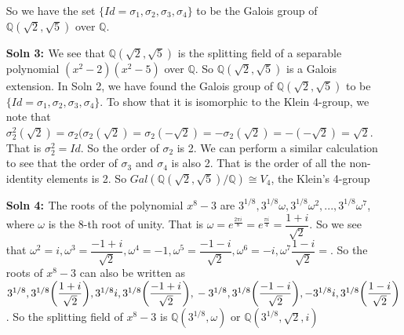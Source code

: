 \documentclass[12pt]{article}
\begin{document}
\begin{enumerate}
    So we have the set $\{Id=\sigma_1, \sigma_2,\sigma_3,\sigma_4\}$ to be the Galois group of $\mathbb{Q}(\sqrt2,\sqrt5)$ over $\mathbb{Q}$.
    \item[\bf{Soln 3: }]  We see that $\mathbb{Q}(\sqrt2,\sqrt5)$ is the splitting field of a separable polynomial $(x^2-2)(x^2-5)$ over $\mathbb{Q}$. So $\mathbb{Q}(\sqrt2,\sqrt5)$ is a Galois extension. In Soln 2, we have found the Galois group of $\mathbb{Q}(\sqrt2,\sqrt5)$ to be
    $\{Id=\sigma_1, \sigma_2,\sigma_3,\sigma_4\}$. To show that it is isomorphic to the Klein 4-group, we note that $\sigma_2^2(\sqrt2)=\sigma_2(\sigma_2(\sqrt2)=\sigma_2(-\sqrt2)=-\sigma_2(\sqrt2)=-(-\sqrt2)=\sqrt2$. That is $\sigma_2^2=Id$. So the order of $\sigma_2$ is 2. We can perform a similar calculation to see that the order of $\sigma_3$ and $\sigma_4$ is also 2. That is the order of all the non-identity elements is 2. So $Gal(\mathbb{Q}(\sqrt2,\sqrt5)/\mathbb{Q}) \cong V_4$, the Klein's 4-group

    \item[\bf{Soln 4: }]  The roots of the polynomial $x^8-3$ are $3^{1/8},3^{1/8}\omega,3^{1/8} \omega^2,...,3^{1/8}\omega^7$, where $\omega$ is the 8-th root of unity. That is $\omega=e^\frac{2\pi i}{8}=e^\frac{\pi i}{4}=\dfrac{1+i}{\sqrt2}.$ So we see that $\omega^2=i,\omega^3=\dfrac{-1+i}{\sqrt2},\omega^4=-1,\omega^5=\dfrac{-1-i}{\sqrt2}, \omega^6=-i,\omega^7\dfrac{1-i}{\sqrt2}=$. So the roots of $x^8-3$ can also be written as $3^{1/8},3^{1/8}\bigg(\dfrac{1+i}{\sqrt2}\bigg),3^{1/8}i,3^{1/8}\bigg(\dfrac{-1+i}{\sqrt2}\bigg),\\-3^{1/8},3^{1/8}\bigg(\dfrac{-1-i}{\sqrt2}\bigg),-3^{1/8}i,3^{1/8}\bigg(\dfrac{1-i}{\sqrt2}\bigg)$. So the splitting field of $x^8-3$ is $\mathbb{Q}(3^{1/8},\omega)$ or $\mathbb{Q}(3^{1/8},\sqrt2,i)$



\end{enumerate}
\end{document}
